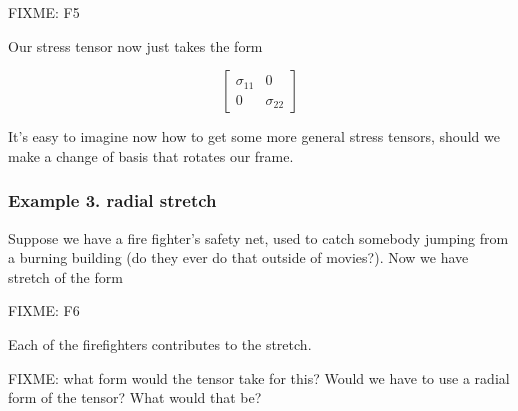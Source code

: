 FIXME: F5

Our stress tensor now just takes the form

\begin{equation}\label{eqn:continuumL3:390}
\begin{bmatrix}
\sigma_{11} & 0 \\
0 & \sigma_{22}
\end{bmatrix}
\end{equation}

It's easy to imagine now how to get some more general stress tensors, should we make a change of basis that rotates our frame.

\subsubsection{Example 3.  radial stretch}

Suppose we have a fire fighter's safety net, used to catch somebody jumping from a burning building (do they ever do that outside of movies?).  Now we have stretch of the form

FIXME: F6

Each of the firefighters contributes to the stretch.  

FIXME: what form would the tensor take for this?  Would we have to use a radial form of the tensor?  What would that be?

\EndArticle
